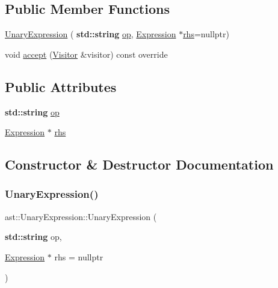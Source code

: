 \subsection*{Public Member Functions}
\begin{DoxyCompactItemize}
\item 
\hyperlink{structast_1_1_unary_expression_a6475332e344fdf3ecbcdf333dd22d708}{Unary\+Expression} (\textbf{ std\+::string} \hyperlink{structast_1_1_unary_expression_a285fff2867097f1d9f7bb0e14e006e46}{op}, \hyperlink{structast_1_1_expression}{Expression} $\ast$\hyperlink{structast_1_1_unary_expression_a6d3c17a7216b97384823c276d118b6d6}{rhs}=nullptr)
\item 
void \hyperlink{structast_1_1_unary_expression_aa81ebeb7c67923476f15795df9a8892e}{accept} (\hyperlink{structast_1_1_visitor}{Visitor} \&visitor) const override
\end{DoxyCompactItemize}
\subsection*{Public Attributes}
\begin{DoxyCompactItemize}
\item 
\textbf{ std\+::string} \hyperlink{structast_1_1_unary_expression_a285fff2867097f1d9f7bb0e14e006e46}{op}
\item 
\hyperlink{structast_1_1_expression}{Expression} $\ast$ \hyperlink{structast_1_1_unary_expression_a6d3c17a7216b97384823c276d118b6d6}{rhs}
\end{DoxyCompactItemize}


\subsection{Constructor \& Destructor Documentation}
\mbox{\label{structast_1_1_unary_expression_a6475332e344fdf3ecbcdf333dd22d708}} 
\subsubsection{\texorpdfstring{Unary\+Expression()}{UnaryExpression()}}
{\footnotesize\ttfamily ast\+::\+Unary\+Expression\+::\+Unary\+Expression (\begin{DoxyParamCaption}\item[{\textbf{ std\+::string}}]{op,  }\item[{\hyperlink{structast_1_1_expression}{Expression} $\ast$}]{rhs = {\ttfamily nullptr} }\end{DoxyParamCaption})\hspace{0.3cm}{\ttfamily [inline]}}



